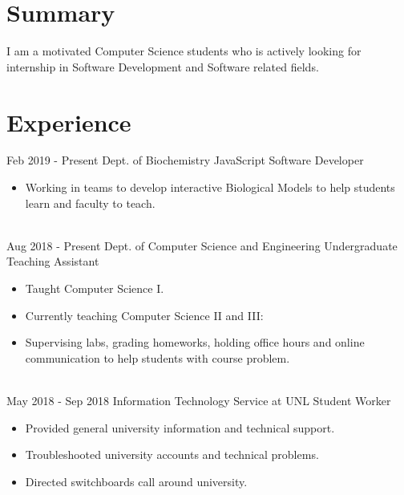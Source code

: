 \documentclass[letterpaper]{twentysecondcv} %
\begin{document}
\makeprofile %
 \section{Summary}
    I am a motivated Computer Science students who is actively looking for internship in Software Development and Software related fields.

\section{Experience}



\begin{twenty} %
\twentyitem
    	{Feb 2019 -}
    	{Present}
        {Dept. of Biochemistry}
        {}
        {JavaScript Software Developer}
        {\begin{itemize}
            \item Working in teams to develop interactive Biological Models to help students learn and faculty to teach.
        \end{itemize}
        }
        \\
\twentyitem
    	{Aug 2018 -}
		{Present}
        {Dept. of Computer Science and Engineering}
        {}
        {Undergraduate Teaching Assistant}
        {\begin{itemize}
        \item Taught Computer Science I.
        \item Currently teaching Computer Science II and III:
        \item Supervising labs, grading homeworks, holding office hours and online communication to help students with course problem.
        \end{itemize}
        }
        \\
\twentyitem
	{May 2018 -}
	{Sep 2018}
    {Information Technology Service at UNL}
    {}
    {Student Worker}
    {
    {\begin{itemize}
    \item Provided general university information and technical support.
    \item Troubleshooted university accounts and technical problems.
    \item Directed switchboards call around university.
    \end{itemize}}
    }
    
        
\end{twenty}
\end{document}
